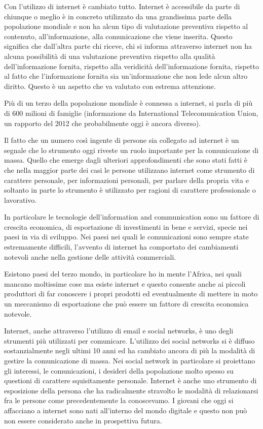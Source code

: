 Con l'utilizzo di internet è cambiato tutto. Internet è accessibile da parte di chiunque o meglio è in concreto utilizzato da una grandissima parte della popolazione mondiale e non ha alcun tipo di valutazione preventiva rispetto al contenuto, all'informazione, alla comunicazione che viene inserita. Questo significa che dall'altra parte chi riceve, chi si informa attraverso internet non ha alcuna possibilità di una valutazione preventiva rispetto alla qualità dell'informazione fornita, rispetto alla veridicità dell'informazione fornita, rispetto al fatto che l'informazione fornita sia un'informazione che non lede alcun altro diritto. Questo è un aspetto che va valutato con estrema attenzione.

Più di un terzo della popolazione mondiale è connessa a internet, si parla di più di 600 milioni di famiglie (informazione da International Telecomunication Union, un rapporto del 2012 che probabilmente oggi è ancora diverso).

Il fatto che un numero così ingente di persone sia collegato ad internet è un segnale che lo strumento oggi riveste un ruolo importante per la comunicazione di massa. Quello che emerge dagli ulteriori approfondimenti che sono stati fatti è che nella maggior parte dei casi le persone utilizzano internet come strumento di carattere personale, per informazioni personali, per parlare della propria vita e soltanto in parte lo strumento è utilizzato per ragioni di carattere professionale o lavorativo.

In particolare le tecnologie dell'information and communication sono un fattore di crescita economica, di esportazione di investimenti in bene e servizi, specie nei paesi in via di sviluppo. Nei paesi nei quali le comunicazioni sono sempre state estremamente difficili, l'avvento di internet ha comportato dei cambiamenti notevoli anche nella gestione delle attività commerciali.

Esistono paesi del terzo mondo, in particolare ho in mente l'Africa, nei quali mancano moltissime cose ma esiste internet e questo consente anche ai piccoli produttori di far conoscere i propri prodotti ed eventualmente di mettere in moto un meccanismo di esportazione che può essere un fattore di crescita economica notevole.

Internet, anche attraverso l'utilizzo di email e social networks, è uno degli strumenti più utilizzati per comunicare. L'utilizzo dei social networks si è diffuso sostanzialmente negli ultimi 10 anni ed ha cambiato ancora di più la modalità di gestire la comunicazione di massa. Nei social network in particolare si proiettano gli interessi, le comunicazioni, i desideri della popolazione molto spesso su questioni di carattere squisitamente personale. Internet è  anche uno strumento di esposizione della persona che ha radicalmente stravolto le modalità di relazionarsi fra le persone come precedentemente la conoscevamo. I giovani che oggi si affacciano a internet sono nati all'interno del mondo digitale e questo non può non essere considerato anche in prospettiva futura.
 
